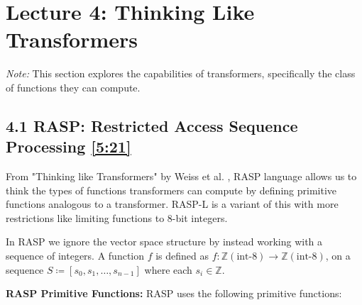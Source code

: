 \documentclass[12pt, twoside]{article}
\begin{document}
\newpage


\thispagestyle{RemoveHeader}


\section*{Lecture 4: Thinking Like Transformers}



\textit{Note:} This section explores the capabilities of transformers, specifically the class of functions they can compute.

\subsection*{4.1 RASP: Restricted Access Sequence Processing
\href{https://youtu.be/2MRAX8EdBA8?si=IgoHB-DrNRVb_ehB&t=321}{[5:21]}}

From "Thinking like Transformers" by Weiss et al. \cite{weiss2021thinking}, RASP language allows us to think the types of functions transformers can compute by defining primitive functions analogous to a transformer. RASP-L is a variant of this with more restrictions like limiting functions to 8-bit integers.

In RASP we ignore the vector space structure by instead working with a sequence of integers. A function $f$ is defined as $f: \mathbb{Z} (\text{int-8}) \to \mathbb{Z} (\text{int-8})$, on a sequence $ S  \coloneqq [s_0,s_1,\dots,s_{n-1}]$ where each $s_i \in \mathbb{Z}$.

\textbf{RASP Primitive Functions:} RASP uses the following primitive functions:
\end{document}
